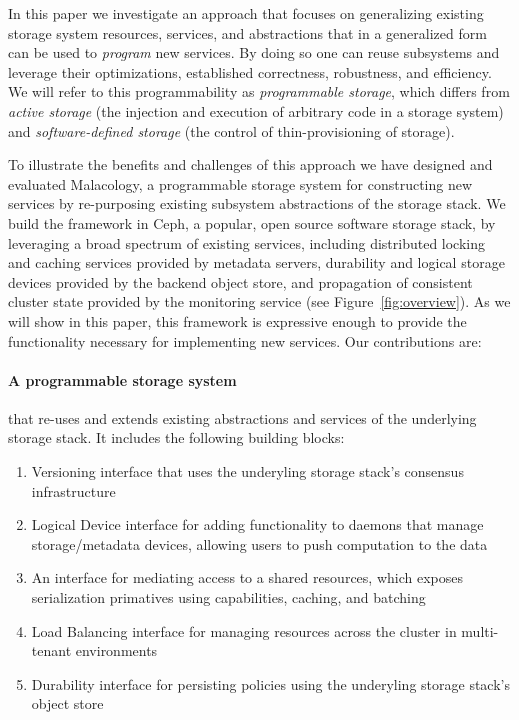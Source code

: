 \documentclass[10pt,twocolumn]{article}
\begin{document}
In this paper we investigate an approach that focuses on generalizing existing
storage system resources, services, and abstractions that in a generalized form
can be used to \emph{program} new services. By doing so one can reuse
subsystems and leverage their optimizations, established correctness,
robustness, and efficiency. We will refer to this programmability as
\emph{programmable storage}, which differs from \emph{active storage} (the
injection and execution of arbitrary code in a storage system) and
\emph{software-defined storage} (the control of thin-provisioning of storage).

To illustrate the benefits and challenges of this approach we have designed and
evaluated Malacology, a programmable storage system for constructing new
services by re-purposing existing subsystem abstractions of the storage stack.
We build the framework in Ceph, a popular, open source software storage stack,
by leveraging a broad spectrum of existing services, including distributed
locking and caching services provided by metadata servers, durability and
logical storage devices provided by the backend object store, and propagation
of consistent cluster state provided by the monitoring service (see
Figure~\ref{fig:overview}). As we will show in this paper, this framework is
expressive enough to provide the functionality necessary for implementing new
services. Our contributions are:

\paragraph*{A programmable storage system} that re-uses and extends existing
abstractions and services of the underlying storage stack. It
includes the following building blocks:

\begin{enumerate}

\item Versioning interface that uses the underyling storage stack's consensus
infrastructure 

\item Logical Device interface for adding functionality to daemons that manage
storage/metadata devices, allowing users to push computation to the data

\item An interface for mediating access to a shared resources, which exposes
serialization primatives using capabilities, caching, and batching

\item Load Balancing interface for managing resources across the cluster in
multi-tenant environments

\item Durability interface for persisting policies using the underyling storage
stack's object store

\end{enumerate}
\end{document}
